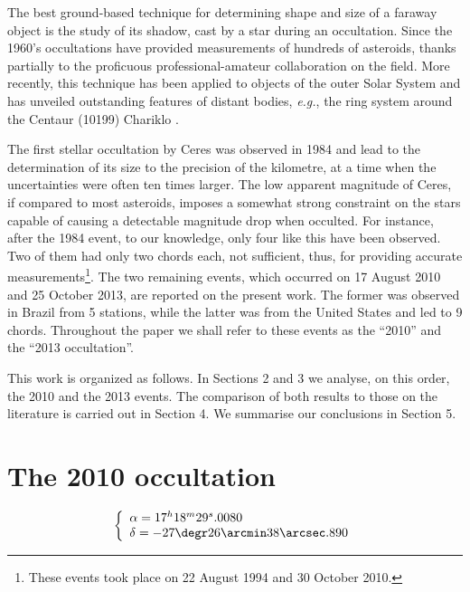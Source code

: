 \documentclass[useAMS,usenatbib]{mn2e}
\begin{document}
The best ground-based technique for determining shape and size of a faraway object is the study of its shadow, cast by a star during an occultation. Since the 1960's occultations have provided measurements of hundreds of asteroids, thanks partially to the proficuous professional-amateur collaboration on the field. More recently, this technique has been applied to objects of the outer Solar System and has unveiled outstanding features of distant bodies, \textit{e.g.}, the ring system around the Centaur (10199) Chariklo \citep{BragaRibas2014}.

The first stellar occultation by Ceres was observed in 1984 \citep{Millis1987} and lead to the determination of its size to the precision of the kilometre, at a time when the uncertainties were often ten times larger. The low apparent magnitude of Ceres, if compared to most asteroids, imposes a somewhat strong constraint on the stars capable of causing a detectable magnitude drop when occulted. For instance, after the 1984 event, to our knowledge, only four like this have been observed. Two of them had only two chords each, not sufficient, thus, for providing accurate measurements\footnote{These events took place on 22 August 1994 and 30 October 2010.}. The two remaining events, which occurred on 17 August 2010 and 25 October 2013, are reported on the present work. The former was observed in Brazil from 5 stations, while the latter was from the United States and led to 9 chords. Throughout the paper we shall refer to these events as the ``2010'' and the ``2013 occultation''.

This work is organized as follows. In Sections 2 and 3 we analyse, on this order, the 2010 and the 2013 events. The comparison of both results to those on the literature is carried out in Section 4. We summarise our conclusions in Section 5.








\section[]{The 2010 occultation}

\begin{equation}
\left\{ 
  \begin{array}{l l}
    \alpha = 17^{h}18^{m}29^{s}.0080\\
    \delta = -27\degr 26\arcmin 38\arcsec.890
  \end{array}
\right.
\end{equation}
\end{document}
